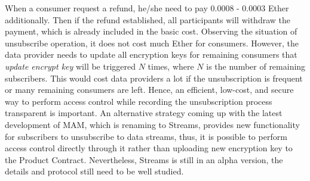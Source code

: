 \begin{spacing}{2.0}
When a consumer request a refund, he/she need to pay 0.0008 - 0.0003 Ether additionally. Then if the refund established, all participants will withdraw the payment, which is already included in the basic cost. Observing the situation of unsubscribe operation, it does not cost much Ether for consumers. However, the data provider needs to update all encryption keys for remaining consumers that \textit{update encrypt key} will be triggered $N$ times, where $N$ is the number of remaining subscribers. This would cost data providers a lot if the unsubscription is frequent or many remaining consumers are left. Hence, an efficient, low-cost, and secure way to perform access control while recording the unsubscription process transparent is important. An alternative strategy coming up with the latest development of MAM, which is renaming to Streams\cite{stream}, provides new functionality for subscribers to unsubscribe to data streams, thus, it is possible to perform access control directly through it rather than uploading new encryption key to the Product Contract. Nevertheless, Streams is still in an alpha version, the details and protocol still need to be well studied.

\begin{table}[h]
    \caption{Data Price Estimation}
    \label{tab:ether}
    \centering
\end{table}

\end{spacing}

